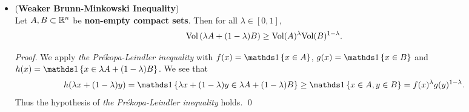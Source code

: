 \documentclass[11pt]{article}
\begin{document}
\begin{itemize}
\begin{proof}
\begin{enumerate}
\item For the induction step, assume that the theorem holds for all dimensions $1 \xdotx{,} n - 1$ and let $f, g, h : \bR^n \to [0, \infty)$,  $\lambda \in (0, 1)$ be such that they satisfy the assumption of the theorem.  Now let $x, y \in \bR^{n-1}$ and $a, b \in \bR$. Then
\begin{align*}
h\paren{\lambda \paren{x, a} + (1-\lambda)\paren{y, b}} \ge f\paren{(x, a)}^{\lambda} g((y, b))^{1- \lambda}, 
\end{align*} so by the inductive hypothesis
\begin{align*}
\int_{\bR^{n-1}} h\paren{(x, \lambda a + (1-\lambda) b)} dx &\ge \paren{\int_{\bR^{n-1}} f\paren{(x, a)} dx}^{\lambda}\paren{\int_{\bR^{n-1}} g((x, b)) dx }^{1- \lambda} 
\end{align*} In other words, introducing
\begin{align*}
F(a) := \int_{\bR^{n-1}} f\paren{(x, a)} dx, \quad G(b) := \int_{\bR^{n-1}} g((x, b)) dx\\
H((\lambda a + (1-\lambda) b)) := \int_{\bR^{n-1}} h\paren{(x, \lambda a + (1-\lambda) b)} dx.
\end{align*} We have
\begin{align*}
H((\lambda a + (1-\lambda) b))  &\ge \paren{F(a)}^{\lambda}\paren{G(b)}^{1- \lambda},
\end{align*} so by \emph{Fubini's theorem} and the one-dimensional inequality, we have
\begin{align*}
\int_{\bR^n}h(x) dx =  \int_{\bR} H(a)   da &\ge \paren{\int_{\bR} F(a) da}^{\lambda}\paren{\int_{\bR} G(a) da}^{1 - \lambda} \\
&= \paren{\int_{\bR^n} f(x) dx}^{\lambda}\paren{\int_{\bR^n} g(x) dx}^{1 - \lambda}.  \qed
\end{align*}
\end{enumerate} 
\end{proof}

\item \begin{corollary} (\textbf{Weaker Brunn-Minkowski Inequality}) \citep{boucheron2013concentration, wainwright2019high}\\
Let $A, B \subset {\mathbb R}^n$ be \textbf{non-empty compact sets}. Then for all $\lambda \in [0, 1]$,
\begin{align}
\text{Vol}\left( \lambda A + (1- \lambda) B \right) &\ge \text{Vol}(A)^{\lambda}\text{Vol}(B)^{1- \lambda}.   \label{ineqn: brunn_minkowski_inequality_weaker}
\end{align}
\end{corollary}
\begin{proof}
We apply \emph{the Pr{\'e}kopa-Leindler inequality} with $f(x) = \ind{x \in A}$, $g(x) = \ind{x \in B}$ and $h(x) = \ind{x \in \lambda A + (1- \lambda) B}$. We see that 
\begin{align*}
h(\lambda x + (1- \lambda) y) &= \ind{\lambda x + (1- \lambda) y \in \lambda A + (1- \lambda) B} \ge \ind{x \in A, y \in B}  = f(x)^{\lambda}g(y)^{1 - \lambda}.
\end{align*} Thus the hypothesis of \emph{the Pr{\'e}kopa-Leindler inequality} holds. \qed
\end{proof}


\end{itemize}
\end{document}

